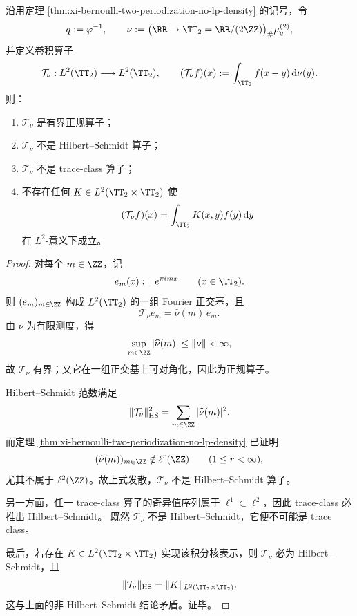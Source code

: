 \begin{theorem}\label{thm:conclusion-periodized-convolution-neither-hs-nor-traceclass}
沿用定理 \ref{thm:xi-bernoulli-two-periodization-no-lp-density} 的记号，令
\[
q:=\varphi^{-1},
\qquad
\nu:=\bigl(\RR\to\TT_2=\RR/(2\ZZ)\bigr)_\#\mu_q^{(2)},
\]
并定义卷积算子
\[
\mathcal T_\nu:L^2(\TT_2)\longrightarrow L^2(\TT_2),
\qquad
(\mathcal T_\nu f)(x):=\int_{\TT_2}f(x-y)\,\mathrm{d}\nu(y).
\]
则：
\begin{enumerate}
  \item \(\mathcal T_\nu\) 是有界正规算子；
  \item \(\mathcal T_\nu\) 不是 Hilbert--Schmidt 算子；
  \item \(\mathcal T_\nu\) 不是 trace-class 算子；
  \item 不存在任何 \(K\in L^2(\TT_2\times \TT_2)\) 使
  \[
  (\mathcal T_\nu f)(x)=\int_{\TT_2}K(x,y)f(y)\,\mathrm{d}y
  \]
  在 \(L^2\)-意义下成立。
\end{enumerate}
\end{theorem}
\begin{proof}
对每个 \(m\in\ZZ\)，记
\[
e_m(x):=e^{\pi i m x}\qquad (x\in\TT_2).
\]
则 \((e_m)_{m\in\ZZ}\) 构成 \(L^2(\TT_2)\) 的一组 Fourier 正交基，且
\[
\mathcal T_\nu e_m=\widehat\nu(m)\,e_m.
\]
由 \(\nu\) 为有限测度，得
\[
\sup_{m\in\ZZ}|\widehat\nu(m)|\le \|\nu\|<\infty,
\]
故 \(\mathcal T_\nu\) 有界；又它在一组正交基上可对角化，因此为正规算子。

Hilbert--Schmidt 范数满足
\[
\|\mathcal T_\nu\|_{\mathrm{HS}}^2
=
\sum_{m\in\ZZ}|\widehat\nu(m)|^2.
\]
而定理 \ref{thm:xi-bernoulli-two-periodization-no-lp-density} 已证明
\[
(\widehat\nu(m))_{m\in\ZZ}\notin \ell^r(\ZZ)
\qquad (1\le r<\infty),
\]
尤其不属于 \(\ell^2(\ZZ)\)。故上式发散，\(\mathcal T_\nu\) 不是 Hilbert--Schmidt 算子。

另一方面，任一 trace-class 算子的奇异值序列属于 \(\ell^1\subset \ell^2\)，因此 trace-class 必推出 Hilbert--Schmidt。
既然 \(\mathcal T_\nu\) 不是 Hilbert--Schmidt，它便不可能是 trace class。

最后，若存在 \(K\in L^2(\TT_2\times \TT_2)\) 实现该积分核表示，则 \(\mathcal T_\nu\) 必为 Hilbert--Schmidt，且
\[
\|\mathcal T_\nu\|_{\mathrm{HS}}=\|K\|_{L^2(\TT_2\times\TT_2)}.
\]
这与上面的非 Hilbert--Schmidt 结论矛盾。证毕。
\end{proof}

